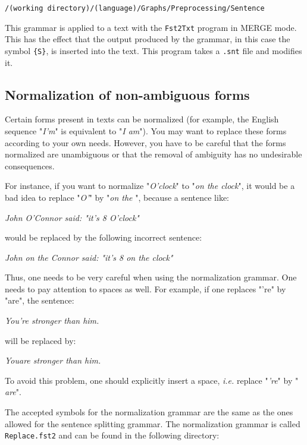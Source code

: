 \bigskip
\verb+/(working directory)/(language)/Graphs/Preprocessing/Sentence+

\bigskip
\noindent This grammar is applied to a text with the \verb+Fst2Txt+ program
 in
MERGE mode. This has the effect that the output produced
by the grammar, in this case the symbol \verb+{S}+, is inserted into
the text. This program takes a \verb+.snt+ file and modifies it.


\subsection{Normalization of non-ambiguous forms}

Certain forms present in texts can be normalized (for example, the English
sequence "\textit{I'm}" is equivalent to "\textit{I am}"). You may want to
replace these forms according to your own needs. However, you have to be careful
that the  forms normalized  are unambiguous or that the removal of ambiguity has
no undesirable consequences.

\bigskip
\noindent For instance, if you want to normalize "\textit{O'clock}" to "\textit{on the
clock}", it would be a bad idea to replace "\textit{O'}" by "\textit{on the }",
because a sentence like:

\bigskip
\textit{John O'Connor said: "it's 8 O'clock"}

\bigskip
\noindent would be replaced by the following incorrect sentence:

\bigskip
\textit{John on the Connor said: "it's 8 on the clock"}

\bigskip
\noindent Thus, one needs to be very careful when using the
normalization grammar. One needs to pay attention to spaces as well. 
For example, if one replaces "'re" by "are", the sentence:

\bigskip
\textit{You're stronger than him.}

\bigskip
\noindent will be replaced by:

\bigskip
\textit{Youare stronger than him.}

\bigskip
\noindent To avoid this problem, one should explicitly insert a space,
\textit{i.e.} replace "\textit{'re}" by "\textit{ are}".

\bigskip
\noindent The accepted symbols for the normalization grammar are the same as the ones
allowed for the sentence splitting grammar. The normalization grammar is called
\verb+Replace.fst2+ and can be found in the following directory:

